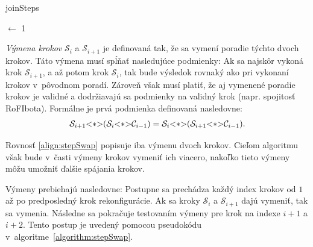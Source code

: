 \documentclass[
  printed, %
  oneside, %
  notable,   %
  nolof,     %
  nolot,     %
]{fithesis3}
\begin{document}
\begin{algorithm}
    \caption{joinSteps}
    \label{algorithm:stepJoin}
    \DontPrintSemicolon
    
    \CurrIndex $\leftarrow$ 1\;
\end{algorithm}

\textit{Výmena krokov} $\mathcal{S}_i$ a $\mathcal{S}_{i + 1}$ je definovaná tak, že sa vymení poradie týchto dvoch krokov. Táto výmena musí spĺňať nasledujúce podmienky: Ak sa najskôr vykoná krok $\mathcal{S}_{i + 1}$, a až potom krok $\mathcal{S}_i$, tak bude výsledok rovnaký ako pri vykonaní krokov v~pôvodnom poradí. Zároveň však musí platiť, že aj vymenené poradie krokov je validné a dodržiavajú sa podmienky na validný krok (napr. spojitosť RoFIbota). Formálne je prvá podmienka definovaná nasledovne: 
\begin{align}
\label{align:stepSwap}
\mathcal{S}_{i + 1} \lstinline{<*>} (\mathcal{S}_i \lstinline{<*>} \mathcal{C}_{i - 1}) = \mathcal{S}_i \lstinline{<*>} (\mathcal{S}_{i + 1} \lstinline{<*>} \mathcal{C}_{i - 1}). 
\end{align}

Rovnosť \ref{align:stepSwap} popisuje iba výmenu dvoch krokov. Cieľom algoritmu však bude v~časti výmeny krokov vymeniť ich viacero, nakoľko tieto výmeny môžu umožniť ďalšie spájania krokov. 

Výmeny prebiehajú nasledovne: Postupne sa prechádza každý index krokov od $1$ až po predposledný krok rekonfigurácie. Ak sa kroky $\mathcal{S}_i$ a $\mathcal{S}_{i + 1}$ dajú vymeniť, tak sa vymenia. Následne sa pokračuje testovaním výmeny pre krok na indexe $i + 1$ a $i + 2$. Tento postup je uvedený pomocou pseudokódu v~algoritme~\ref{algorithm:stepSwap}. 
\end{document}
